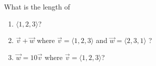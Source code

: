 \documentclass[12pt]{amsart}
\begin{document}
\begin{question}
	What is the length of
	\begin{enumerate}
		\item $\langle 1,2,3 \rangle$?
		      \vspace{5cm}
		\item $\vec{v} + \vec{w}$ where $\vec{v} = \langle  1,2,3 \rangle$ and $\vec{w} = \langle 2,3,1  \rangle$ ?
		      \vspace{5cm}
		\item $\vec{w} = 10 \vec{v}$ where $\vec{v} = \langle  1,2,3 \rangle$?
		      \vspace{5cm}
	\end{enumerate}
\end{question}



\printbibliography
%
%
\end{document}
